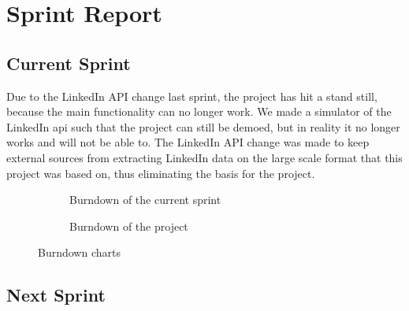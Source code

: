 \section{Sprint Report}

\subsection{Current Sprint}
Due to the LinkedIn API change last sprint, the project has hit a stand still, because the main functionality can no longer work. We made a simulator of the LinkedIn api such that the project can still be demoed, but in reality it no longer works and will not be able to. The LinkedIn API change was made to keep external sources from extracting LinkedIn data on the large scale format that this project was based on, thus eliminating the basis for the project.

\begin{figure}[!ht]
    \centering
    \begin{subfigure}[b]{0.5\textwidth}
        \scalebox{.6}{}
        \caption{Burndown of the current sprint}
        \label{fig:burndownSprint}
    \end{subfigure}%
    \begin{subfigure}[b]{0.5\textwidth}
        \scalebox{.7}{}
        \caption{Burndown of the project}
        \label{fig:burndownProject}
    \end{subfigure}
    \caption{Burndown charts}
    \label{fig:burndown}
\end{figure}

\subsection{Next Sprint}

